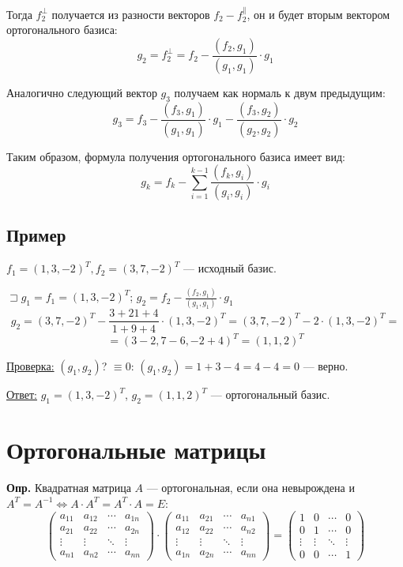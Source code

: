 \documentclass[12pt]{article}
\begin{document}
Тогда $f_2^\perp$ получается из разности векторов $f_2 - f_2^\parallel$,
он и будет вторым вектором ортогонального базиса:
\[g_2 = f_2^\perp = f_2 - \frac{(f_2, g_1)}{(g_1, g_1)} \cdot g_1\]

Аналогично следующий вектор $g_3$ получаем как нормаль к двум предыдущим:
\[g_3 = f_3 - \frac{(f_3, g_1)}{(g_1, g_1)} \cdot g_1 - \frac{(f_3, g_2)}{(g_2, g_2)} \cdot g_2\]\par

Таким образом, формула получения ортогонального базиса имеет вид:
\[g_k = f_k - \sum_{i=1}^{k-1}\frac{(f_k, g_i)}{(g_i, g_i)} \cdot g_i\]
\subsection*{Пример}
\hspace{36pt}
$f_1 = {(1, 3, -2)}^T, f_2 = {(3, 7, -2)}^T$ --- исходный базис.

$\sqsupset g_1 = f_1 = {(1, 3, -2)}^T$;
\hspace{36pt} $g_2 = f_2 - \frac{(f_2, g_1)}{(g_1, g_1)} \cdot g_1$
\[g_2 = {(3, 7, -2)}^T - \frac{3 + 21 + 4}{1 + 9 + 4} \cdot {(1, 3, -2)}^T =
    {(3, 7, -2)}^T - 2 \cdot {(1, 3, -2)}^T = \]
\[ = {(3 - 2, 7 - 6, -2 + 4)}^T = {(1, 1, 2)}^T \]

\underline{Проверка:} $(g_1, g_2)$? $\equiv 0$:\hspace{36pt}
$(g_1, g_2) = 1 + 3 - 4 = 4 - 4 = 0$ --- верно.

\underline{Ответ:} $g_1 = {(1, 3, -2)}^T$, $g_2 = {(1, 1, 2)}^T$ --- ортогональный базис.

\section{Ортогональные матрицы}
\textbf{Опр.} Квадратная матрица $A$ --- ортогональная, если она невырождена и
$A^T = A^{-1} \Leftrightarrow A \cdot A^T = A^T \cdot A = E$:
\[
    \begin{pmatrix}
        a_{11} & a_{12} & \cdots & a_{1n} \\
        a_{21} & a_{22} & \cdots & a_{2n} \\
        \vdots & \vdots & \ddots & \vdots \\
        a_{n1} & a_{n2} & \cdots & a_{nn}
    \end{pmatrix}
    \cdot
    \begin{pmatrix}
        a_{11} & a_{21} & \cdots & a_{n1} \\
        a_{12} & a_{22} & \cdots & a_{n2} \\
        \vdots & \vdots & \ddots & \vdots \\
        a_{1n} & a_{2n} & \cdots & a_{nn}
    \end{pmatrix}
    =
    \begin{pmatrix}
        1      & 0      & \cdots & 0      \\
        0      & 1      & \cdots & 0      \\
        \vdots & \vdots & \ddots & \vdots \\
        0      & 0      & \cdots & 1
    \end{pmatrix}
\]
\end{document}
